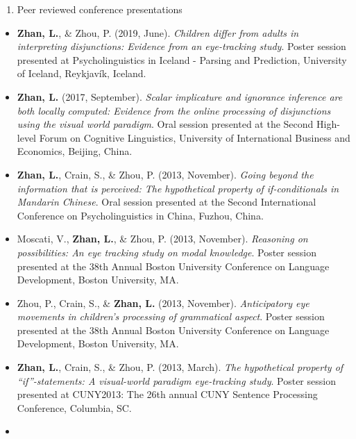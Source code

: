 \documentclass[
  12pt,
]{article}
\providecommand{\tightlist}{%
  \setlength{\itemsep}{0pt}\setlength{\parskip}{0pt}}
\begin{document}
\begin{enumerate}
\def\labelenumi{\arabic{enumi}.}
\setcounter{enumi}{3}
\tightlist
\item
  Peer reviewed conference presentations
\end{enumerate}

\begin{itemize}
\item
  \textbf{Zhan, L.}, \& Zhou, P. (2019, June). \emph{Children differ
  from adults in interpreting disjunctions: Evidence from an
  eye-tracking study}. Poster session presented at Psycholinguistics in
  Iceland - Parsing and Prediction, University of Iceland, Reykjavík,
  Iceland. \href{https://publications.likan.info/Talks/PIPP_Poster.pdf}{
  \faFilePdf[regular] }
\item
  \textbf{Zhan, L.} (2017, September). \emph{Scalar implicature and
  ignorance inference are both locally computed: Evidence from the
  online processing of disjunctions using the visual world paradigm}.
  Oral session presented at the Second High-level Forum on Cognitive
  Linguistics, University of International Business and Economics,
  Beijing, China.
  \href{https://publications.likan.info/Talks/ZhanL2017UIBE.pdf}{
  \faFilePdf[regular] }
\item
  \textbf{Zhan, L.}, Crain, S., \& Zhou, P. (2013, November).
  \emph{Going beyond the information that is perceived: The hypothetical
  property of if-conditionals in Mandarin Chinese}. Oral session
  presented at the Second International Conference on Psycholinguistics
  in China, Fuzhou, China.
\item
  Moscati, V., \textbf{Zhan, L.}, \& Zhou, P. (2013, November).
  \emph{Reasoning on possibilities: An eye tracking study on modal
  knowledge}. Poster session presented at the 38th Annual Boston
  University Conference on Language Development, Boston University, MA.
\item
  Zhou, P., Crain, S., \& \textbf{Zhan, L.} (2013, November).
  \emph{Anticipatory eye movements in children's processing of
  grammatical aspect}. Poster session presented at the 38th Annual
  Boston University Conference on Language Development, Boston
  University, MA.
\item
  \textbf{Zhan, L.}, Crain, S., \& Zhou, P. (2013, March). \emph{The
  hypothetical property of ``if''-statements: A visual-world paradigm
  eye-tracking study}. Poster session presented at CUNY2013: The 26th
  annual CUNY Sentence Processing Conference, Columbia, SC.
\item

\end{itemize}
\end{document}
